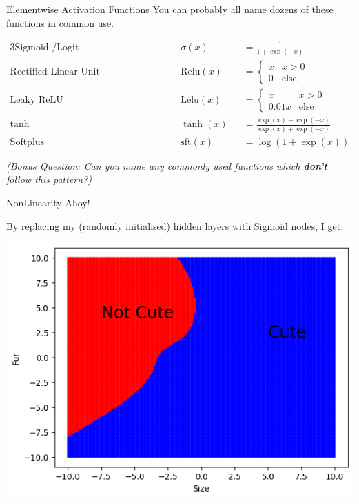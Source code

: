 \documentclass[]{SangerLibrary/sanger-present}
\begin{document}
	\begin{frame}{Elementwise Activation Functions}
		You can probably all name dozens of these functions in common use. 

		\begin{alignat*}{3}
			\text{Sigmoid /Logit}& \hspace{1cm} && \sigma(x) &&  = \frac{1}{1 + \exp(-x)} 
			\\
			\text{Rectified Linear Unit (ReLU)  } & &&\text{Relu}(x) && = \begin{cases} x & x > 0 \\ 0 &\text{else} \end{cases}
			\\
			\text{Leaky ReLU  } & && \text{Lelu}(x) && = \begin{cases} x & x > 0 \\ 0.01x &\text{else} \end{cases} 
			\\
			\text{tanh} & && \tanh(x) && = \frac{\exp(x) - \exp(-x)}{\exp(x) + \exp(-x)}
			\\
			\text{Softplus} & && \text{sft}(x) && = \log\left( 1+ \exp(x) \right)
		\end{alignat*}

		\textit{(Bonus Question: Can you name any commonly used functions which \textbf{don't} follow this pattern?)}
	\end{frame}


	\begin{frame}{NonLinearity Ahoy!}
	
		By replacing my (randomly initialised) hidden layers with Sigmoid nodes, I get:

		\includegraphics[width=\linewidth,height=0.8\paperheight,keepaspectratio=true]{NonLinearMLP.png}
	\end{frame}
\end{document}
